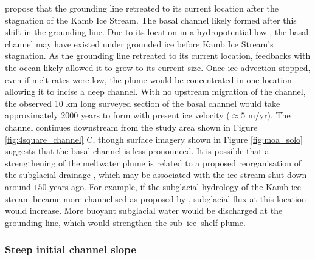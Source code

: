 \cite{horgan2017poststagnation} propose that the grounding line retreated to its current location after the stagnation of the Kamb Ice Stream. The basal channel likely formed after this shift in the grounding line. 
Due to its location in a hydropotential low \citep{le2009subglacial}, the basal channel may have existed under grounded ice before Kamb Ice Stream's stagnation. As the grounding line retreated to its current location, feedbacks with the ocean likely allowed it to grow to its current size. Once ice advection stopped, even if  melt rates were low, the plume would be concentrated in one location allowing it to incise a deep channel. With no upstream migration of the channel, the observed 10 km long surveyed section of the basal channel would take approximately 2000 years to form with present ice velocity ($\approx 5$ m/yr). The channel continues downstream from the study area shown in Figure \ref{fig:4square_channel} C, though surface imagery shown in Figure \ref{fig:moa_solo} suggests that the basal channel is less pronounced.
It is possible that a strengthening of the meltwater plume is related to a proposed reorganisation of the subglacial drainage \cite [e.g.][] {anandakrishnan1997stagnation}, which may be associated with the ice stream shut down around $150$ years ago. For example, if the subglacial hydrology of the Kamb ice stream became more channelised as proposed by \cite{lelandais2018modelled}, subglacial flux at this location would increase. More buoyant subglacial water would be discharged at the grounding line, which would strengthen the sub--ice--shelf plume.  


\subsubsection{Steep initial channel slope} \label{sec:steep}

